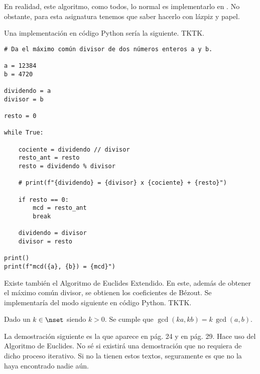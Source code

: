 En realidad, este algoritmo, como todos, lo normal es implementarlo en
. No obstante, para esta asignatura tenemos que saber hacerlo
con lázpiz y papel.

Una implementación en código Python sería la siguiente. TKTK.

\begin{verbatim}
# Da el máximo común divisor de dos números enteros a y b.

a = 12384
b = 4720

dividendo = a
divisor = b

resto = 0

while True:

    cociente = dividendo // divisor
    resto_ant = resto
    resto = dividendo % divisor

    # print(f"{dividendo} = {divisor} x {cociente} + {resto}")

    if resto == 0:
        mcd = resto_ant
        break

    dividendo = divisor
    divisor = resto

print()
print(f"mcd({a}, {b}) = {mcd}")
\end{verbatim}

Existe también el Algoritmo de Euclides Extendido. En este, además de
obtener el máximo común divisor, se obtienen los coeficientes de Bézout. Se
implementaría del modo siguiente en código Python. TKTK.

\begin{proposition}\label{teor-mcd-multiplos}
  Dado un $k \in \nset$ siendo $k > 0$. Se cumple que $\gcd(ka, kb) = k \,
  \gcd(a, b)$.
\end{proposition}

La demostración siguiente es la que aparece en \cite{texto-uned} pág. 24 y
en \cite{burton} pág. 29. Hace uso del Algoritmo de Euclides. No sé si
existirá una demostración que no requiera de dicho proceso iterativo. Si no
la tienen estos textos, seguramente es que no la haya encontrado nadie aún.

